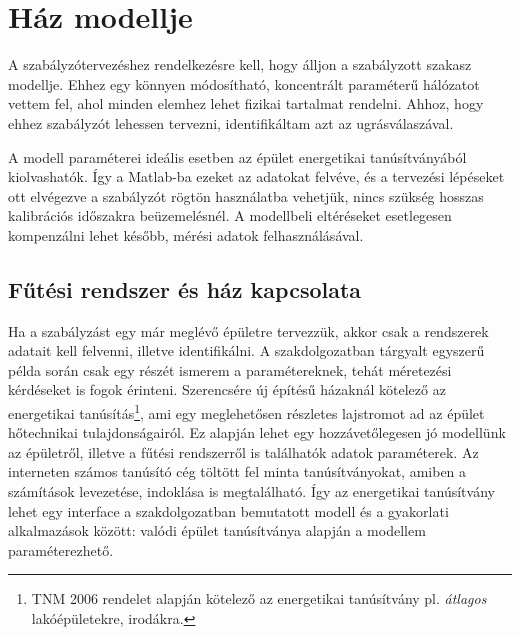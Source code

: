 \chapter{Ház modellje}

A szabályzótervezéshez rendelkezésre kell, hogy álljon a szabályzott szakasz modellje. Ehhez egy könnyen módosítható, koncentrált paraméterű hálózatot vettem fel,
ahol minden elemhez lehet fizikai tartalmat rendelni. Ahhoz, hogy ehhez szabályzót lehessen tervezni, identifikáltam azt az ugrásválaszával. %

A modell paraméterei ideális esetben az épület energetikai tanúsítványából kiolvashatók. Így a Matlab-ba ezeket az adatokat felvéve, és a tervezési lépéseket ott elvégezve a szabályzót rögtön használatba vehetjük, nincs szükség hosszas kalibrációs időszakra beüzemelésnél. A modellbeli eltéréseket esetlegesen kompenzálni lehet később, mérési adatok felhasználásával.%

\section{Fűtési rendszer és ház kapcsolata}

Ha a szabályzást egy már meglévő épületre tervezzük, akkor csak a rendszerek adatait kell felvenni, illetve identifikálni. A szakdolgozatban tárgyalt egyszerű példa során csak egy részét ismerem a paramétereknek, tehát méretezési kérdéseket is fogok érinteni.  Szerencsére új építésű házaknál kötelező az energetikai tanúsítás\footnote{TNM 2006 rendelet alapján kötelező az energetikai tanúsítvány pl. \textit{átlagos} lakóépületekre, irodákra.}, ami egy meglehetősen részletes lajstromot ad az épület hőtechnikai tulajdonságairól. Ez alapján lehet egy hozzávetőlegesen jó modellünk az épületről, illetve a fűtési rendszerről is találhatók adatok paraméterek. Az interneten számos tanúsító cég töltött fel minta tanúsítványokat, amiben a számítások levezetése, indoklása is megtalálható. Így az energetikai tanúsítvány lehet egy interface a szakdolgozatban bemutatott modell és a gyakorlati alkalmazások között: valódi épület tanúsítványa alapján a modellem paraméterezhető.



